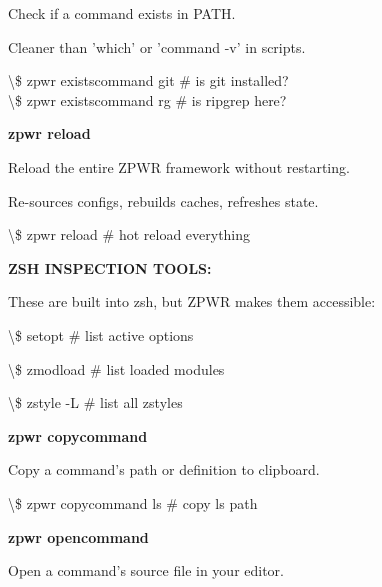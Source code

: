 \documentclass[11pt,a4paper,twoside]{book}
\begin{document}
Check if a command exists in PATH.

Cleaner than 'which' or 'command -v' in scripts.

\begin{codebox}
\textbackslash{}\$ zpwr existscommand git      \# is git installed?\\
\textbackslash{}\$ zpwr existscommand rg       \# is ripgrep here?\\
\end{codebox}


\vspace{12pt}
{\bfseries\color{neonyellow} zpwr reload}\vspace{4pt}

Reload the entire ZPWR framework without restarting.

Re-sources configs, rebuilds caches, refreshes state.

\begin{codebox}
\textbackslash{}\$ zpwr reload                 \# hot reload everything\\
\end{codebox}


\vspace{12pt}
{\bfseries\color{neonyellow} ZSH INSPECTION TOOLS:}\vspace{4pt}

These are built into zsh, but ZPWR makes them accessible:

\textbackslash{}\$ setopt                      \# list active options

\textbackslash{}\$ zmodload                    \# list loaded modules

\textbackslash{}\$ zstyle -L                   \# list all zstyles


\vspace{12pt}
{\bfseries\color{neonyellow} zpwr copycommand}\vspace{4pt}

Copy a command's path or definition to clipboard.

\begin{codebox}
\textbackslash{}\$ zpwr copycommand ls         \# copy ls path\\
\end{codebox}


\vspace{12pt}
{\bfseries\color{neonyellow} zpwr opencommand}\vspace{4pt}

Open a command's source file in your editor.
\end{document}
